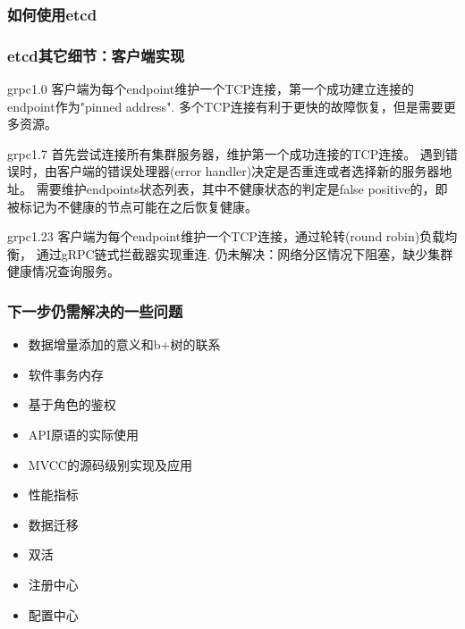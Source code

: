 \documentclass{beamer}
\begin{document}
\begin{frame}
\frametitle{如何使用etcd}
\end{frame}

%
%
\begin{frame}
\frametitle{etcd其它细节：客户端实现}

\begin{block}{grpc1.0}
客户端为每个endpoint维护一个TCP连接，第一个成功建立连接的endpoint作为"pinned address". 
多个TCP连接有利于更快的故障恢复，但是需要更多资源。
\end{block}

\begin{block}{grpc1.7}
首先尝试连接所有集群服务器，维护第一个成功连接的TCP连接。
遇到错误时，由客户端的错误处理器(error handler)决定是否重连或者选择新的服务器地址。
需要维护endpoints状态列表，其中不健康状态的判定是false positive的，即被标记为不健康的节点可能在之后恢复健康。
\end{block}

\begin{block}{grpc1.23}
客户端为每个endpoint维护一个TCP连接，通过轮转(round robin)负载均衡，
通过gRPC链式拦截器实现重连.
\alert{仍未解决：}网络分区情况下阻塞，缺少集群健康情况查询服务。
\end{block}

\end{frame}

%
%



\begin{frame}
\frametitle{下一步仍需解决的一些问题}

\begin{itemize}
    \item 数据增量添加的意义和b+树的联系
    \item 软件事务内存
    \item 基于角色的鉴权
    \item API原语的实际使用
    \item MVCC的源码级别实现及应用
    \item 性能指标
    \item 数据迁移
    \item 双活
    \item 注册中心
    \item 配置中心
\end{itemize}
\end{frame}
\end{document}
